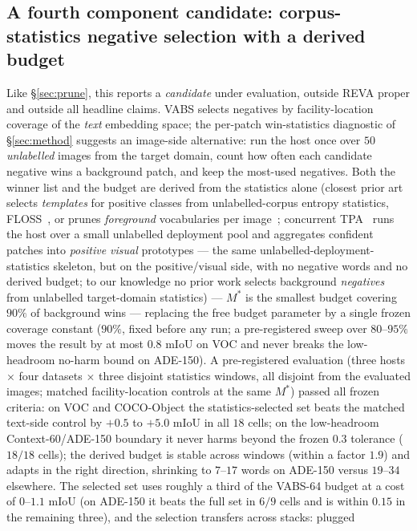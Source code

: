 \documentclass[11pt]{article}
\newcommand{\miou}{mIoU}
\newcommand{\reva}{REVA}
\begin{document}
\subsection{A fourth component candidate: corpus-statistics negative selection with a derived budget}
\label{sec:winstat}
Like \S\ref{sec:prune}, this reports a \emph{candidate} under evaluation,
outside \reva{} proper and outside all headline claims. VABS selects
negatives by facility-location coverage of the \emph{text} embedding
space; the per-patch win-statistics diagnostic of \S\ref{sec:method}
suggests an image-side alternative: run the host once over $50$
\emph{unlabelled} images from the target domain, count how often each
candidate negative wins a background patch, and keep the most-used
negatives. Both the winner list and the budget are derived from the
statistics alone (closest prior art selects \emph{templates} for
positive classes from unlabelled-corpus entropy statistics,
FLOSS~\citep{floss2025}, or prunes \emph{foreground} vocabularies
per image~\citep{freecp2025}; concurrent TPA~\citep{tpa2026} runs the
host over a small unlabelled deployment pool and aggregates confident
patches into \emph{positive visual} prototypes --- the same
unlabelled-deployment-statistics skeleton, but on the positive/visual
side, with no negative words and no derived budget; to our knowledge
no prior work selects background \emph{negatives} from unlabelled
target-domain statistics) ---
$M^\ast$ is the smallest budget covering $90\%$ of
background wins --- replacing the free budget parameter by a single
frozen coverage constant ($90\%$, fixed before any run; a
pre-registered sweep over $80$--$95\%$ moves the result by at most
$0.8$ \miou{} on VOC and never breaks the low-headroom no-harm bound
on ADE-150). A pre-registered
evaluation (three hosts $\times$ four datasets $\times$ three disjoint
statistics windows, all disjoint from the evaluated images; matched
facility-location controls at the same $M^\ast$) passed all frozen
criteria: on VOC and COCO-Object the statistics-selected set beats the
matched text-side control by $+0.5$ to $+5.0$ \miou{} in all $18$
cells; on the low-headroom Context-60/ADE-150 boundary it never harms
beyond the frozen $0.3$ tolerance ($18/18$ cells); the derived budget is
stable across windows (within a factor $1.9$) and adapts in the right
direction, shrinking to $7$--$17$ words on ADE-150 versus $19$--$34$
elsewhere. The selected set uses roughly a third of the VABS-64 budget at
a cost of $0$--$1.1$ \miou{} (on ADE-150 it beats the full set in $6/9$
cells and is within $0.15$ in the remaining three), and the selection transfers across stacks: plugged
\end{document}
